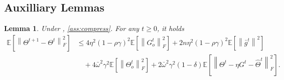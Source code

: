 \documentclass[10pt]{article} %
\theoremstyle{plain}
\newtheorem{lemma}[theorem]{Lemma}
\theoremstyle{definition}
\theoremstyle{remark}
\newcommand{\bw}{\bar{\omega}}
\newcommand{\avgg}{\bar{g}}
\newcommand{\norm}[1]{\left\| #1 \right\|}
\begin{document}
\subsection{Auxilliary Lemmas}
\begin{lemma} \label{lem:theta_1stepnew} Under , \ref{ass:compress}. For any $t \geq 0$, it holds 
    \begin{align}
        \mathbb{E} \left[ \norm{\Theta^{t+1} - \Theta^t}_F^2 \right] &\leq 4 \eta^2(1-\rho\gamma)^2 \mathbb{E} \left[ \norm{G_o^t}_F^2 \right] + 2 n \eta^2(1-\rho\gamma)^2 \mathbb{E} \left[ \norm{ \avgg^t }^2 \right]
        \\ &\quad  + 4 \bw^2 \gamma^2 \mathbb{E} \left[ \norm{\Theta_o^t}_F^2 \right] + 2 \bw^2 \gamma^2(1-\delta) \mathbb{E} \left[ \norm{\Theta^t - \eta G^t - \hat{\Theta}^t}_F^2 \right]. \nonumber
    \end{align}
\end{lemma}
\end{document}
